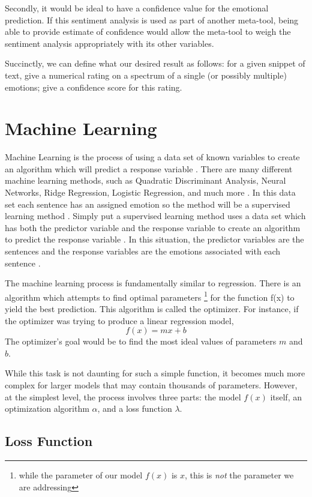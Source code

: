 \documentclass[titlepage,letterpaper]{article}
\begin{document}
Secondly, it would be ideal to have a confidence value for the emotional prediction. If this sentiment analysis is used as part of another meta-tool, being able to provide estimate of confidence would allow the meta-tool to weigh the sentiment analysis appropriately with its other variables.

Succinctly, we can define what our desired result as follows: for a given snippet of text, give a numerical rating on a spectrum of a single (or possibly multiple) emotions; give a confidence score for this rating.

\section{Machine Learning}

Machine Learning is the process of using a data set of known variables to create an algorithm which will predict a response variable \cite{Statlearning}. There are many different machine learning methods, such as Quadratic Discriminant Analysis, Neural Networks, Ridge Regression, Logistic Regression, and much more \cite{Statlearning}. In this data set each sentence has an assigned emotion so the method will be a supervised learning method \cite{Statlearning}. Simply put a supervised learning method uses a data set which has both the predictor variable and the response variable to create an algorithm to predict the response variable \cite{Statlearning}. In this situation, the predictor variables are the sentences and the response variables are the emotions associated with each sentence \cite{Statlearning}. 

The machine learning process is fundamentally similar to regression. There is an algorithm which attempts to find optimal parameters \footnote{while the parameter of our model $f(x)$ is $x$, this is \emph{not} the parameter we are addressing} for the function f(x) to yield the best prediction. This algorithm is called the optimizer. For instance, if the optimizer was trying to produce a linear regression model, \[f(x) = mx + b \] The optimizer’s goal would be to find the most ideal values of parameters $m$ and $b$. 

While this task is not daunting for such a simple function, it becomes much more complex for larger models that may contain thousands of parameters. However, at the simplest level, the process involves three parts: the model $f(x)$ itself, an optimization algorithm $\alpha$,  and a loss function $\lambda$.

\subsection{Loss Function}
\end{document}
